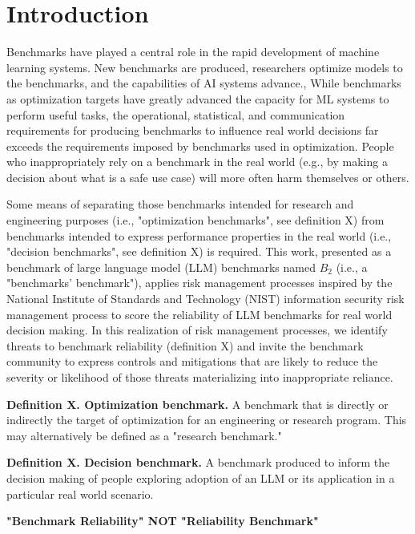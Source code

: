 \documentclass{article}
\begin{document}
\section{Introduction}
Benchmarks have played a central role in the rapid development of machine learning systems. New benchmarks are produced, researchers optimize models to the benchmarks, and the capabilities of AI systems advance., While benchmarks as optimization targets have greatly advanced the capacity for ML systems to perform useful tasks, the operational, statistical, and communication requirements for producing benchmarks to influence real world decisions far exceeds the requirements imposed by benchmarks used in optimization. People who inappropriately rely on a benchmark in the real world (e.g., by making a decision about what is a safe use case) will more often harm themselves or others.

Some means of separating those benchmarks intended for research and engineering purposes (i.e., "optimization benchmarks", see definition X) from benchmarks intended to express performance properties in the real world (i.e., "decision benchmarks", see definition X) is required. This work, presented as a benchmark of large language model (LLM) benchmarks named \(B_2\) (i.e., a "benchmarks' benchmark"), applies risk management processes inspired by the National Institute of Standards and Technology (NIST) information security risk management process to score the reliability of LLM benchmarks for real world decision making. In this realization of risk management processes, we identify threats to benchmark reliability (definition X) and invite the benchmark community to express controls and mitigations that are likely to reduce the severity or likelihood of those threats materializing into inappropriate reliance.

{\bf Definition X. Optimization benchmark.} A benchmark that is directly or indirectly the target of optimization for an engineering or research program. This may alternatively be defined as a "research benchmark."

{\bf Definition X. Decision benchmark.} A benchmark produced to inform the decision making of people exploring adoption of an LLM or its application in a particular real world scenario.

\begin{center}
    \begin{tcolorbox}[colback=blue!10, colframe=blue!50, width=\textwidth, boxrule=0.5mm, sharp corners, coltext=black, halign=center]
        \bf "Benchmark Reliability" NOT "Reliability Benchmark"
    \end{tcolorbox}
\end{center}
\end{document}
